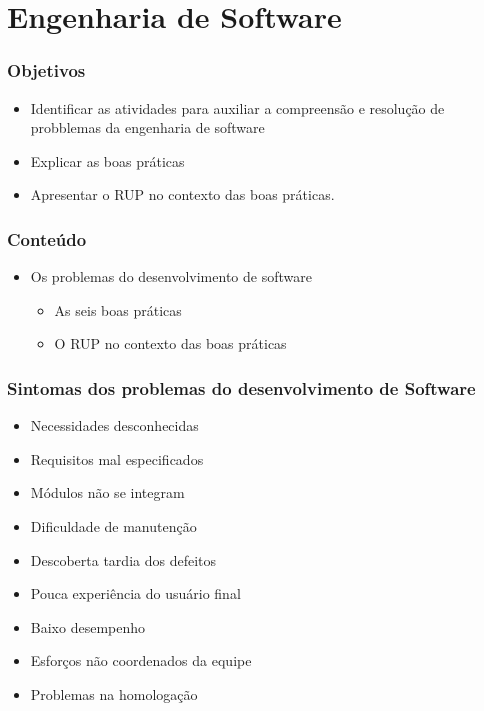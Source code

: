 
\section{Engenharia de Software}

\begin{frame}
\frametitle{Objetivos}
\begin{itemize}
 \item Identificar as atividades para auxiliar a compreensão e resolução de probblemas da engenharia de software
 \item Explicar as boas práticas
 \item Apresentar o RUP no contexto das boas práticas.
\end{itemize}
\end{frame}

\begin{frame}
 \frametitle{Conteúdo}
 \begin{itemize}
  \item Os problemas do desenvolvimento de software
  \begin{itemize}
   \item As seis boas práticas
   \item O RUP no contexto das boas práticas
  \end{itemize}
 \end{itemize}
\end{frame}

\begin{frame}
 \frametitle{Sintomas dos problemas do desenvolvimento de Software}
 \begin{itemize}
  \item Necessidades desconhecidas
  \item Requisitos mal especificados
  \item Módulos não se integram
  \item Dificuldade de manutenção
  \item Descoberta tardia dos defeitos
  \item Pouca experiência do usuário final
  \item Baixo desempenho
  \item Esforços não coordenados da equipe
  \item Problemas na homologação
 \end{itemize}	
\end{frame}

